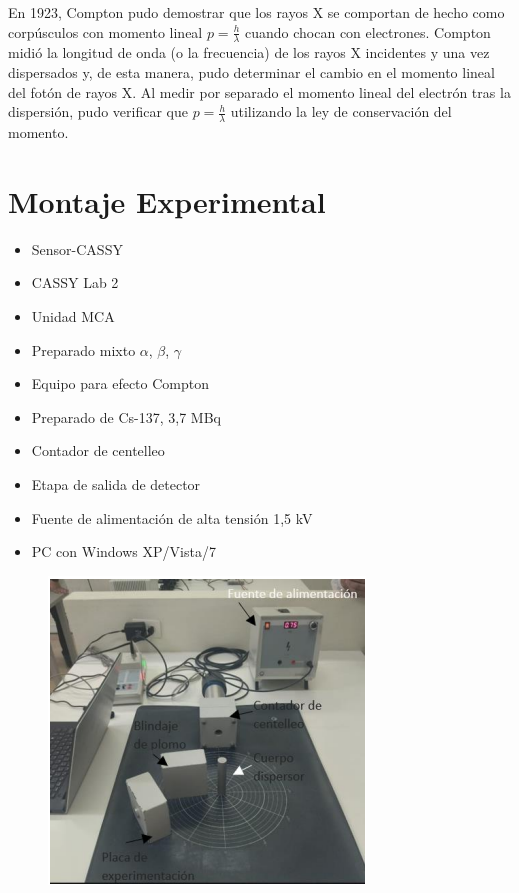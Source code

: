 \documentclass[letterpaper, 12pt]{article}
\begin{document}
En 1923, Compton pudo demostrar que los rayos X se
comportan de hecho como corpúsculos con momento lineal $p =
      \frac{h}{\lambda}$ cuando chocan con electrones. Compton
midió la longitud de onda (o la frecuencia) de los rayos X
incidentes y una vez dispersados y, de esta manera, pudo
determinar el cambio en el momento lineal del fotón de
rayos X. Al medir por separado el momento lineal del
electrón tras la dispersión, pudo verificar que $p =
      \frac{h}{\lambda}$ utilizando la ley de conservación del
momento.

\section{Montaje Experimental}

\begin{itemize}
      \item Sensor-CASSY
      \item CASSY Lab 2
      \item Unidad MCA
      \item Preparado mixto $\alpha$, $\beta$, $\gamma$
      \item Equipo para efecto Compton
      \item Preparado de Cs-137, 3,7 MBq
      \item Contador de centelleo
      \item Etapa de salida de detector
      \item Fuente de alimentación de alta tensión 1,5 kV
      \item PC con Windows XP/Vista/7
\end{itemize}

\begin{figure}[H]
      \begin{center}
            \includegraphics[width=.6\linewidth]{./Images/Fig.Montaje_1.png}
            \caption{}
      \end{center}
\end{figure}
\end{document}
